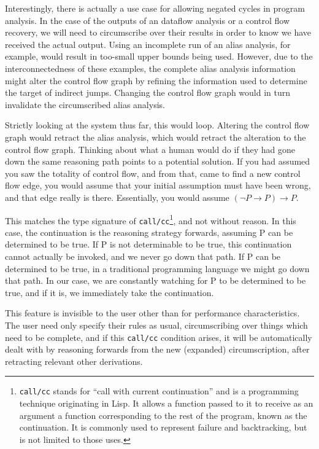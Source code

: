 Interestingly, there is actually a use case for allowing negated cycles in program analysis.
In the case of the outputs of an dataflow analysis or a control flow recovery, we will need to circumscribe over their results in order to know we have received the actual output.
Using an incomplete run of an alias analysis, for example, would result in too-small upper bounds being used.
However, due to the interconnectedness of these examples, the complete alias analysis information might alter the control flow graph by refining the information used to determine the target of indirect jumps.
Changing the control flow graph would in turn invalidate the circumscribed alias analysis.

Strictly looking at the system thus far, this would loop.
Altering the control flow graph would retract the alias analysis, which would retract the alteration to the control flow graph.
Thinking about what a human would do if they had gone down the same reasoning path points to a potential solution.
If you had assumed you saw the totality of control flow, and from that, came to find a new control flow edge, you would assume that your initial assumption must have been wrong, and that edge really is there.
Essentially, you would assume $(\neg P \rightarrow P) \rightarrow P$.

This matches the type signature of \texttt{call/cc}\footnote{
	\texttt{call/cc} stands for ``call with current continuation'' and is a programming technique originating in Lisp.
	It allows a function passed to it to receive as an argument a function corresponding to the rest of the program, known as the continuation.
	It is commonly used to represent failure and backtracking, but is not limited to those uses.
}, and not without reason.
In this case, the continuation is the reasoning strategy forwards, assuming P can be determined to be true.
If P is not determinable to be true, this continuation cannot actually be invoked, and we never go down that path.
If P can be determined to be true, in a traditional programming language we might go down that path.
In our case, we are constantly watching for P to be determined to be true, and if it is, we immediately take the continuation.

This feature is invisible to the user other than for performance characteristics.
The user need only specify their rules as usual, circumscribing over things which need to be complete, and if this \texttt{call/cc} condition arises, it will be automatically dealt with by reasoning forwards from the new (expanded) circumscription, after retracting relevant other derivations.



